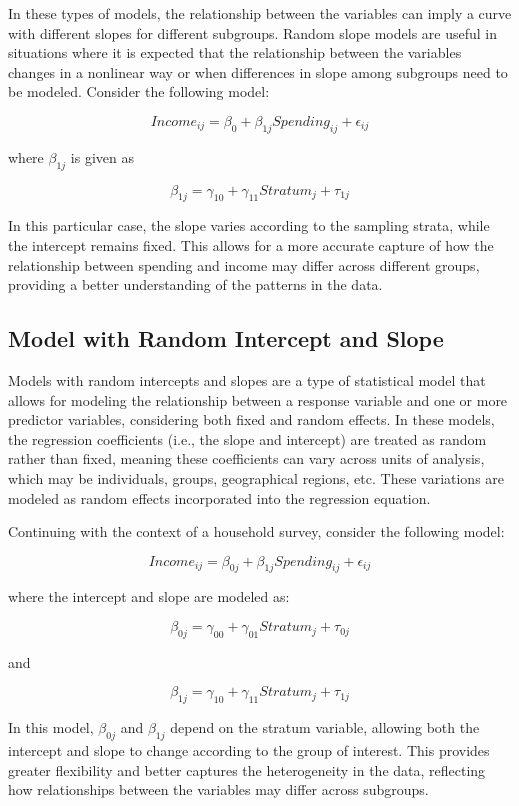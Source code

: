 \documentclass[
  12pt,
]{book}
\begin{document}
In these types of models, the relationship between the variables can imply a curve with different slopes for different subgroups. Random slope models are useful in situations where it is expected that the relationship between the variables changes in a nonlinear way or when differences in slope among subgroups need to be modeled. Consider the following model:

\[
Income_{ij} = \beta_{0} + \beta_{1j} Spending_{ij} + \epsilon_{ij}
\]

where \(\beta_{1j}\) is given as

\[
\beta_{1j} = \gamma_{10} + \gamma_{11} Stratum_{j} + \tau_{1j}
\]

In this particular case, the slope varies according to the sampling strata, while the intercept remains fixed. This allows for a more accurate capture of how the relationship between spending and income may differ across different groups, providing a better understanding of the patterns in the data.

\subsection{Model with Random Intercept and Slope}\label{model-with-random-intercept-and-slope}

Models with random intercepts and slopes are a type of statistical model that allows for modeling the relationship between a response variable and one or more predictor variables, considering both fixed and random effects. In these models, the regression coefficients (i.e., the slope and intercept) are treated as random rather than fixed, meaning these coefficients can vary across units of analysis, which may be individuals, groups, geographical regions, etc. These variations are modeled as random effects incorporated into the regression equation.

Continuing with the context of a household survey, consider the following model:

\[
Income_{ij} = \beta_{0j} + \beta_{1j} Spending_{ij} + \epsilon_{ij}
\]

where the intercept and slope are modeled as:

\[
\beta_{0j} = \gamma_{00} + \gamma_{01} Stratum_{j} + \tau_{0j}
\]

and

\[
\beta_{1j} = \gamma_{10} + \gamma_{11} Stratum_{j} + \tau_{1j}
\]

In this model, \(\beta_{0j}\) and \(\beta_{1j}\) depend on the stratum variable, allowing both the intercept and slope to change according to the group of interest. This provides greater flexibility and better captures the heterogeneity in the data, reflecting how relationships between the variables may differ across subgroups.
\end{document}
